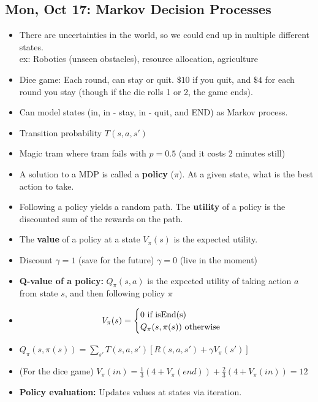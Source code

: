 \documentclass[10pt, oneside]{article}
\begin{document}
\subsection{Mon, Oct 17: Markov Decision Processes}

\begin{itemize}

\item There are uncertainties in the world, so we could end up in multiple different states.\\
ex: Robotics (unseen obstacles), resource allocation, agriculture

\item Dice game: Each round, can stay or quit. $\$10$ if you quit, and $\$4$ for each round you stay (though if the die rolls 1 or 2, the game ends).

\item Can model states (in, in - stay, in - quit, and END) as Markov process.

\item Transition probability $T(s, a, s')$

\item Magic tram where tram fails with $p=0.5$ (and it costs 2 minutes still)

\item A solution to a MDP is called a \textbf{policy} ($\pi$). At a given state, what is the best action to take.

\item Following a policy yields a random path. The \textbf{utility} of a policy is the discounted sum of the rewards on the path.

\item The \textbf{value} of a policy at a state $V_{\pi}(s)$ is the expected utility.

\item Discount $\gamma = 1$ (save for the future) $\gamma = 0$ (live in the moment)

\item \textbf{Q-value of a policy:} $Q_\pi(s,a)$ is the expected utility of taking action $a$ from state $s$, and then following policy $\pi$

\item \[ V_\pi(s) = \begin{cases} 
      0 \text{ if isEnd(s)}\\
     Q_\pi(s,\pi(s)) \text{ otherwise}
   \end{cases}\\
\]

\item $Q_\pi(s, \pi(s)) = \sum_{s'}T(s,a,s')[R(s,a,s')+\gamma V_\pi(s')]$

\item (For the dice game) $V_\pi(in) = \frac{1}{3}(4+V_\pi(end))+\frac{2}{3}(4+V_\pi(in)) = 12$

\item \textbf{Policy evaluation:} Updates values at states via iteration.
\end{itemize}
\end{document}
